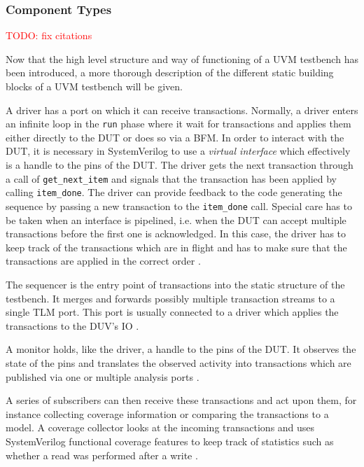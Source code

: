\documentclass[11pt]{report}
\newcommand{\ttt}{\texttt}
\newcommand{\todo}[1]{\textcolor{red}{TODO: #1}}
\begin{document}
\subsubsection{Component Types} %

\todo{fix citations}

Now that the high level structure and way of functioning of a UVM testbench has been introduced, a more thorough
description of the different static building blocks of a UVM testbench will be given.

A driver has a port on which it can receive transactions. Normally, a driver enters an infinite loop in the \ttt{run}
phase where it wait for transactions and applies them either directly to the DUT or does so via a BFM. In order to
interact with the DUT, it is necessary in SystemVerilog to use a \textit{virtual interface} which effectively is a
handle to the pins of the DUT. The driver gets the next transaction through a call of \ttt{get\_next\_item} and
signals that the transaction has been applied by calling \ttt{item\_done}. The driver can provide feedback to the
code generating the sequence by passing a new transaction to the \ttt{item\_done} call. Special care has to be taken
when an interface is pipelined, i.e. when the DUT can accept multiple transactions before the first one is
acknowledged. In this case, the driver has to keep track of the transactions which are in flight and has to make sure
that the transactions are applied in the correct order \cite[ch. 4.7]{mehta2018asic}.

The sequencer is the entry point of transactions into the static structure of the testbench. It merges and forwards
possibly multiple transaction streams to a single TLM port. This port is usually connected to a driver which applies
the transactions to the DUV's IO \cite[Ch. 23]{salemi2013uvm}.

A monitor holds, like the driver, a handle to the pins of the DUT. It observes the state of the pins and translates
the observed activity into transactions which are published via one or multiple analysis ports \cite{}.

A series of subscribers can then receive these transactions and act upon them, for instance collecting coverage
information or comparing the transactions to a model. A coverage collector looks at the incoming transactions and
uses SystemVerilog functional coverage features to keep track of statistics such as whether a read was performed
after a write \cite{}.
\end{document}
